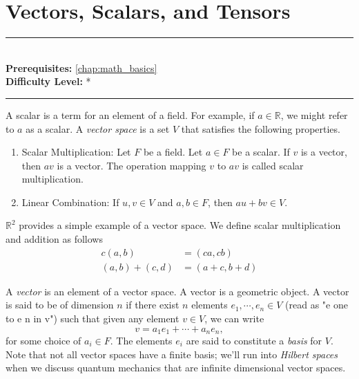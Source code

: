 \documentclass[book.tex]{subfiles}
\begin{document}
\chapter{Vectors, Scalars, and Tensors}
\label{chap:vectors}
\noindent\rule{11cm}{0.4pt} \\
\textbf{Prerequisites:} \autoref{chap:math_basics} \\
\textbf{Difficulty Level:} * \\
\noindent\rule{11cm}{0.4pt}
\vspace{5mm}

A scalar is a term for an element of a field. For example, if $a \in \mathbb{R}$, we might refer to $a$ as a scalar. A \textit{vector space} is a set $V$ that satisfies the following properties.

\begin{enumerate}
    \item Scalar Multiplication: Let $F$ be a field. Let $a \in F$ be a scalar. If $v$ is a vector, then $av$ is a vector. The operation mapping $v$ to $av$ is called scalar multiplication.
    \item Linear Combination: If $u, v \in V$ and $a, b \in F$, then $au + bv \in V$. 
\end{enumerate}

$\mathbb{R}^2$ provides a simple example of a vector space. We define scalar multiplication and addition as follows
\begin{align}
    c(a, b) &= (ca, cb) \\
    (a, b) + (c, d) &= (a+c, b+d)
\end{align}

A \textit{vector} is an element of a vector space. A vector is a geometric object. A vector is said to be of dimension $n$ if there exist $n$ elements $e_1,\cdots,e_n \in V$ (read as "e one to e n in v") such that given any element $v \in V$, we can write
\begin{equation}
    v = a_1 e_1 + \cdots + a_n e_n,
\end{equation}
for some choice of $a_i \in F$. The elements $e_i$ are said to constitute a \textit{basis} for $V$. Note that not all vector spaces have a finite basis; we'll run into \textit{Hilbert spaces} when we discuss quantum mechanics that are infinite dimensional vector spaces.


\end{document}
